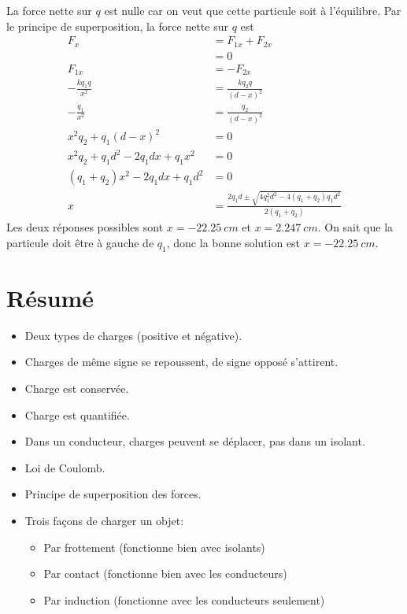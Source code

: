\begin{reponsebox}
La force nette sur $q$ est nulle car on veut que cette particule soit à
l'équilibre.  Par le principe de superposition, la force nette sur $q$ est
\begin{align*}
     F_x &= F_{1x} + F_{2x} \\
         &= 0  \\
  F_{1x} &= -F_{2x} \\
  -\frac{kq_1q}{x^2} &= \frac{kq_2q}{(d - x)^2} \\
  -\frac{q_1}{x^2} &= \frac{q_2}{(d - x)^2} \\
  x^2q_2 + q_1(d - x)^2 &= 0 \\
  x^2q_2 + q_1d^2 - 2q_1dx + q_1x^2 &= 0 \\
  (q_1 + q_2) x^2 - 2 q_1 d x + q_1d^2 &= 0 \\
  x &= \frac{2q_1 d \pm \sqrt{4q_1^2d^2 - 4(q_1 + q_2) q_1 d^2}}{2(q_1 + q_2)}
\end{align*}
Les deux réponses possibles sont $x = \SI{-22.25}{cm}$ et $x = \SI{2.247}{cm}$.
On sait que la particule doit être à gauche de $q_1$, donc la bonne solution
est $x = \SI{-22.25}{cm}$.
\end{reponsebox}


\sectionline


\section{Résumé}

\begin{itemize}
  \item Deux types de charges (positive et négative).
  \item Charges de même signe se repoussent, de signe opposé s'attirent.
  \item Charge est conservée.
  \item Charge est quantifiée.
  \item Dans un conducteur, charges peuvent se déplacer, pas dans un isolant.
  \item Loi de Coulomb.
  \item Principe de superposition des forces.
  \item Trois façons de charger un objet:
    \begin{itemize}
      \item Par frottement (fonctionne bien avec isolants)
      \item Par contact (fonctionne bien avec les conducteurs)
      \item Par induction (fonctionne avec les conducteurs seulement)
    \end{itemize}
\end{itemize}


